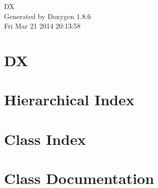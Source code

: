 \documentclass[twoside]{book}
\newcommand{\clearemptydoublepage}{%
  \newpage{\pagestyle{empty}\cleardoublepage}%
}
\begin{document}
\hypersetup{pageanchor=false}
\begin{titlepage}
\vspace*{7cm}
\begin{center}%
{\Large D\-X }\\
\vspace*{1cm}
{\large Generated by Doxygen 1.8.6}\\
\vspace*{0.5cm}
{\small Fri Mar 21 2014 20:13:58}\\
\end{center}
\end{titlepage}
\clearemptydoublepage
\tableofcontents
\clearemptydoublepage
{}
\hypersetup{pageanchor=true}

\chapter{D\-X}
\label{md__r_e_a_d_m_e}
\hypertarget{md__r_e_a_d_m_e}{}

\chapter{Hierarchical Index}

\chapter{Class Index}

\chapter{Class Documentation}




























\newpage
{}
{}
\printindex
\end{document}
